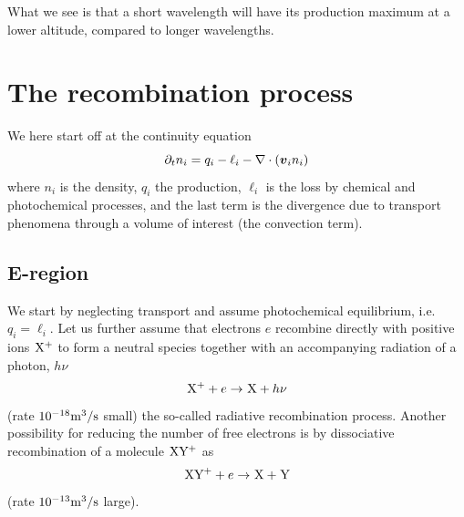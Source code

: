 What we see is that a short wavelength will have its production maximum at a lower altitude, compared to longer wavelengths.

\section{The recombination process}
We here start off at the continuity equation
\begin{equation*}
    \partial_{t}n_i=q_i-\ell_i-\nabla\cdot\left(\boldsymbol{v}_{i}n_i\right)
\end{equation*}
where \(n_i\) is the density, \(q_i\) the production, \(\ell_i\) is the loss by chemical and photochemical processes, and the last term is the divergence due to transport phenomena through a volume of interest (the convection term).

\subsection{E-region}
We start by neglecting transport and assume photochemical equilibrium, i.e.~\(q_i=\ell_i\). Let us further assume that electrons \(e\) recombine directly with positive ions \(\prescript{}{}{\textnormal{X}}^+\) to form a neutral species together with an accompanying radiation of a photon, \(h\nu \)
\begin{equation*}
    \prescript{}{}{\textnormal{X}}^++e\rightarrow \prescript{}{}{\textnormal{X}}+h\nu
\end{equation*}
(rate \(10^{-18}\textnormal{m}^3/\textnormal{s}\) small) the so-called radiative recombination process. Another possibility for reducing the number of free electrons is by dissociative recombination of a molecule \(\prescript{}{}{\textnormal{XY}}^+\) as
\begin{equation*}
    \prescript{}{}{\textnormal{XY}}^++e\rightarrow \prescript{}{}{\textnormal{X}}+\prescript{}{}{\textnormal{Y}}
\end{equation*}
(rate \(10^{-13}\textnormal{m}^3/\textnormal{s}\) large).


